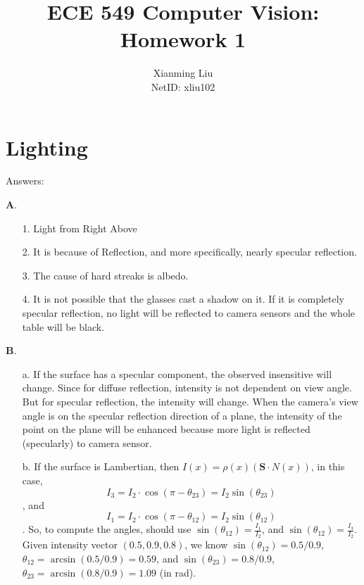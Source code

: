 \documentclass[11pt]{article}
\begin{document}
 
 
\title{ECE 549 Computer Vision: Homework 1}%
\author{Xianming Liu\\ %
NetID: xliu102} %
 
\maketitle
 
\section{Lighting}

Answers:

\textbf{A}.
\begin{itemize}
\item[1.] Light from Right Above
\item[2.] It is because of Reflection, and more specifically, nearly specular reflection.
\item[3.] The cause of hard streaks is albedo. 
\item[4.] It is not possible that the glasses cast a shadow on it. If it is completely specular reflection, no light will be reflected to camera sensors and the whole table will be black.
\end{itemize}

\textbf{B}.
\begin{itemize}
\item[a.] If the surface has a specular component, the observed insensitive will change. Since for diffuse reflection, intensity is not dependent on view angle. But for specular reflection, the intensity will change. When the camera's view angle is on the specular reflection direction of a plane, the intensity of the point on the plane will be enhanced because more light is reflected (specularly) to camera sensor.
\item[b.] If the surface is Lambertian, then $I(x)= \rho(x)(\mathbf{S} \cdot N(x))$, in this case, 
\[
I_3 = I_2 \cdot \cos(\pi - \theta_{23}) = I_2 \sin(\theta_{23})
\], 
and 
\[
I_1 = I_2 \cdot \cos(\pi - \theta_{12}) = I_2 \sin(\theta_{12})
\].
So, to compute the angles, should use $\sin(\theta_{12}) = \frac{I_1}{I_2}$, and $\sin(\theta_{12}) = \frac{I_3}{I_2}$.
Given intensity vector $(0.5,0.9,0.8)$, we know $\sin(\theta_{12}) = 0.5/0.9$, $\theta_{12} = \arcsin(0.5/0.9)=0.59$, and $\sin(\theta_{23}) = 0.8/0.9$, $\theta_{23} = \arcsin(0.8/0.9)=1.09$ (in rad).
\end{itemize}
\end{document}
